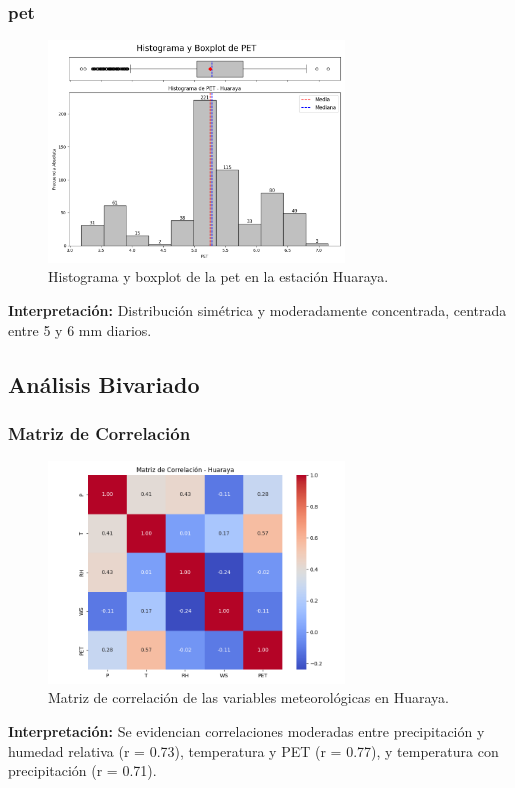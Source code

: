 \subsubsection*{\gls{pet} }
\begin{figure}[htbp]
\centering
\includegraphics[width=0.7\textwidth]{resultados/por_estacion_meteorologica/Huaraya/PET_histograma.png}
\caption{Histograma y boxplot de la \gls{pet}  en la estación Huaraya.}
\label{fig:huaraya_PET}
\end{figure}
\textbf{Interpretación:} Distribución simétrica y moderadamente concentrada, centrada entre 5 y 6 mm diarios.

\subsection{Análisis Bivariado}

\subsubsection*{Matriz de Correlación}
\begin{figure}[htbp]
\centering
\includegraphics[width=0.7\textwidth]{resultados/por_estacion_meteorologica/Huaraya/matriz_correlacion.png}
\caption{Matriz de correlación de las variables meteorológicas en Huaraya.}
\label{fig:huaraya_corr}
\end{figure}
\textbf{Interpretación:} Se evidencian correlaciones moderadas entre precipitación y humedad relativa (r = 0.73), temperatura y PET (r = 0.77), y temperatura con precipitación (r = 0.71).

